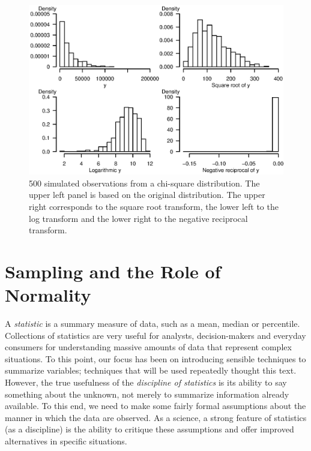 \begin{figure}[htp]
  \begin{center}
    \includegraphics[width=1\textwidth]
        {Chapter1/F1Chisquare.eps}
    \caption{\label{F1:ChiSquare} \small 500
simulated observations from a chi-square distribution. The upper
left panel is based on the original distribution. The upper right
corresponds to the square root transform, the lower left to the log
transform and the lower right to the negative reciprocal transform.}
  \end{center}
\end{figure}


\section{Sampling and the Role of Normality}


A \emph{statistic} is a summary measure of data, such as a mean,
median or percentile. Collections of statistics are very useful for
analysts, decision-makers and everyday consumers for understanding
massive amounts of data that represent complex situations. To this
point, our focus has been on introducing sensible techniques to
summarize variables; techniques that will be used repeatedly thought
this text. However, the true usefulness of the \emph{discipline of
statistics} is its ability to say something about the unknown, not
merely to summarize information already available. To this end, we
need to make some fairly formal assumptions about the manner in
which the data are observed. As a science, a strong feature of
statistics (as a discipline) is the ability to critique these
assumptions and offer improved alternatives in specific situations.

